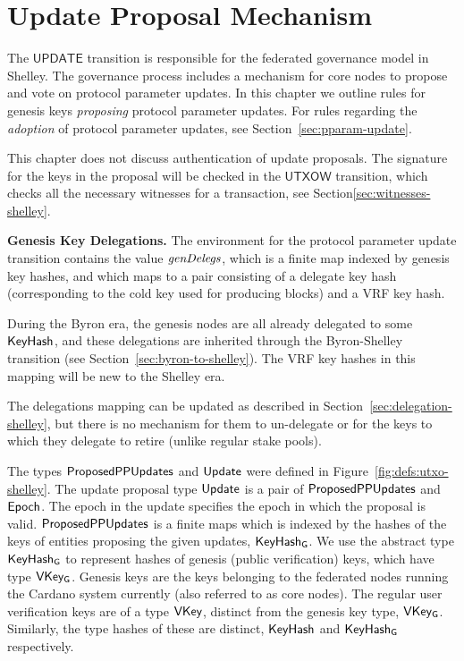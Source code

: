 \section{Update Proposal Mechanism}
\label{sec:update}


The $\mathsf{UPDATE}$ transition is responsible for the federated governance model in Shelley.
The governance process includes a mechanism for core nodes to propose and vote on
protocol parameter updates. In this chapter we
outline rules for genesis keys \textit{proposing} protocol parameter updates.
For rules regarding the \textit{adoption} of protocol
parameter updates, see Section~\ref{sec:pparam-update}.

This chapter does not discuss authentication of update proposals.
The signature for the keys in the proposal will be checked in the
$\mathsf{UTXOW}$ transition, which checks all the necessary witnesses
for a transaction, see Section\ref{sec:witnesses-shelley}.

\textbf{Genesis Key Delegations.} The environment for the protocol parameter
update transition contains the value $\mathit{genDelegs}$,
which is a finite map indexed by genesis key hashes,
and which maps to a pair consisting of a delegate key hash
(corresponding to the cold key used for producing blocks) and
a VRF key hash.

During the Byron era, the genesis nodes are all
already delegated to some $\mathsf{KeyHash}$, and these delegations are inherited
through the Byron-Shelley transition (see Section~\ref{sec:byron-to-shelley}).
The VRF key hashes in this mapping will be new to the Shelley era.

The delegations mapping can be updated as described in
Section~\ref{sec:delegation-shelley},
but there is no mechanism for them to un-delegate or for the keys to which they delegate
to retire (unlike regular stake pools).

The types $\mathsf{ProposedPPUpdates}$ and $\mathsf{Update}$ were defined in
Figure~\ref{fig:defs:utxo-shelley}.
The update proposal type $\mathsf{Update}$ is a pair of $\mathsf{ProposedPPUpdates}$ and $\mathsf{Epoch}$.
The epoch in the update specifies the epoch in which the proposal is valid.
$\mathsf{ProposedPPUpdates}$ is a finite maps which is indexed by the hashes of the keys of
entities proposing the given updates, $\mathsf{KeyHash_G}$.
We use the abstract type $\mathsf{KeyHash_G}$ to represent hashes of genesis
(public verification) keys, which have type $\mathsf{VKey_G}$.
Genesis keys are the keys belonging to the federated
nodes running the Cardano system currently (also referred to as core nodes).
The regular user verification keys are of a type $\mathsf{VKey}$, distinct from the
genesis key type, $\mathsf{VKey_G}$. Similarly, the type hashes of these
are distinct, $\mathsf{KeyHash}$ and $\mathsf{KeyHash_G}$ respectively.

